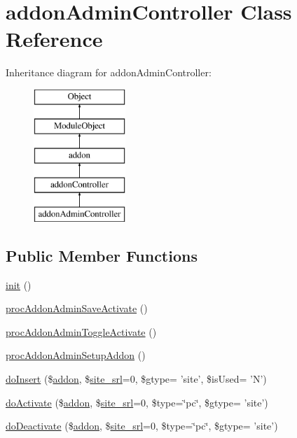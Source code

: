 \hypertarget{classaddonAdminController}{\section{addon\+Admin\+Controller Class Reference}
\label{classaddonAdminController}
}
Inheritance diagram for addon\+Admin\+Controller\+:\begin{figure}[H]
\begin{center}
\leavevmode
\includegraphics[height=5.000000cm]{classaddonAdminController}
\end{center}
\end{figure}
\subsection*{Public Member Functions}
\begin{DoxyCompactItemize}
\item 
\hyperlink{classaddonAdminController_a429384cd42bbb45d8a9f6be4073cc7b6}{init} ()
\item 
\hyperlink{classaddonAdminController_a59081b3459b0704e973fdbe2fc5d14d1}{proc\+Addon\+Admin\+Save\+Activate} ()
\item 
\hyperlink{classaddonAdminController_a97250cb7cb4dc0b78789b8a9186d94d4}{proc\+Addon\+Admin\+Toggle\+Activate} ()
\item 
\hyperlink{classaddonAdminController_a43db10c21a41c0ebbeb13257d9bf86ea}{proc\+Addon\+Admin\+Setup\+Addon} ()
\item 
\hyperlink{classaddonAdminController_a26ac8a98f91ad7a48d9307b7a87932c7}{do\+Insert} (\$\hyperlink{classaddon}{addon}, \$\hyperlink{ko_8install_8php_a8b1406b4ad1048041558dce6bfe89004}{site\+\_\+srl}=0, \$gtype= 'site', \$is\+Used= 'N')
\item 
\hyperlink{classaddonAdminController_a226fc2d221e8f5272dabeb1ef86cb9f3}{do\+Activate} (\$\hyperlink{classaddon}{addon}, \$\hyperlink{ko_8install_8php_a8b1406b4ad1048041558dce6bfe89004}{site\+\_\+srl}=0, \$type=\char`\"{}pc\char`\"{}, \$gtype= 'site')
\item 
\hyperlink{classaddonAdminController_ae520cdfe4f5e3f2e7c24c34d5a8d316e}{do\+Deactivate} (\$\hyperlink{classaddon}{addon}, \$\hyperlink{ko_8install_8php_a8b1406b4ad1048041558dce6bfe89004}{site\+\_\+srl}=0, \$type=\char`\"{}pc\char`\"{}, \$gtype= 'site')
\end{DoxyCompactItemize}
